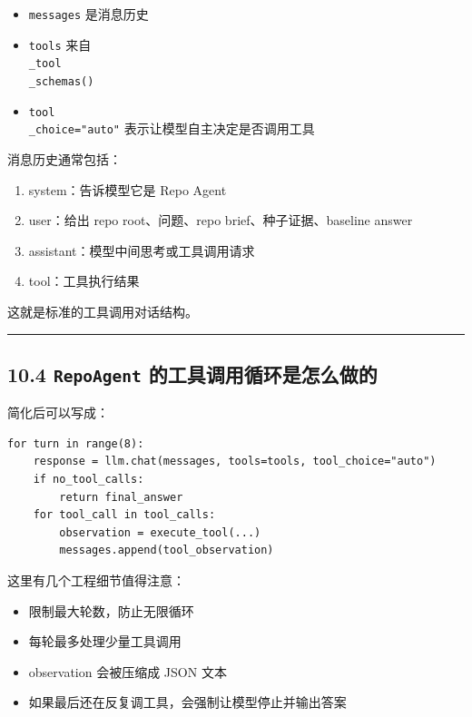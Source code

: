 \documentclass[UTF8,12pt,openany]{ctexbook}
\begin{document}
\begin{itemize}
\item \texttt{messages} 是消息历史
\item \texttt{tools} 来自 \texttt{\\_tool\\_schemas()}
\item \texttt{tool\\_choice="auto"} 表示让模型自主决定是否调用工具
\end{itemize}

消息历史通常包括：\par

\begin{enumerate}
\item system：告诉模型它是 Repo Agent
\item user：给出 repo root、问题、repo brief、种子证据、baseline answer
\item assistant：模型中间思考或工具调用请求
\item tool：工具执行结果
\end{enumerate}

这就是标准的工具调用对话结构。\par

\hrule

\subsection{10.4 \texttt{RepoAgent} 的工具调用循环是怎么做的}

简化后可以写成：\par

\begin{lstlisting}
for turn in range(8):
    response = llm.chat(messages, tools=tools, tool_choice="auto")
    if no_tool_calls:
        return final_answer
    for tool_call in tool_calls:
        observation = execute_tool(...)
        messages.append(tool_observation)
\end{lstlisting}

这里有几个工程细节值得注意：\par

\begin{itemize}
\item 限制最大轮数，防止无限循环
\item 每轮最多处理少量工具调用
\item observation 会被压缩成 JSON 文本
\item 如果最后还在反复调工具，会强制让模型停止并输出答案
\end{itemize}
\end{document}

